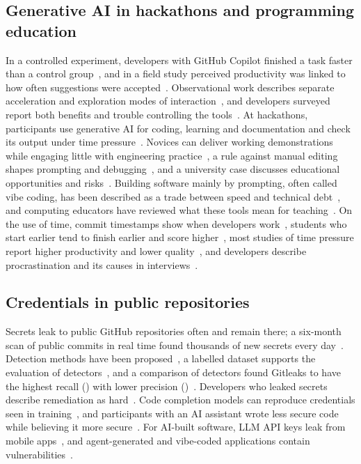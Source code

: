\documentclass{article}
\begin{document}
\subsection{Generative AI in hackathons and programming education}
In a controlled experiment, developers with GitHub Copilot finished a task faster than a control group~\cite{peng2023copilot}, and in a field study perceived productivity was linked to how often suggestions were accepted~\cite{ziegler2024copilot}. Observational work describes separate acceleration and exploration modes of interaction~\cite{barke2023grounded}, and developers surveyed report both benefits and trouble controlling the tools~\cite{liang2024usability}. At hackathons, participants use generative AI for coding, learning and documentation and check its output under time pressure~\cite{zhou2026quickbuild}. Novices can deliver working demonstrations while engaging little with engineering practice~\cite{gama2025vibes}, a rule against manual editing shapes prompting and debugging~\cite{chen2026codeforall}, and a university case discusses educational opportunities and risks~\cite{sajja2024genaihack}. Building software mainly by prompting, often called vibe coding, has been described as a trade between speed and technical debt~\cite{waseem2025vibepractice}, and computing educators have reviewed what these tools mean for teaching~\cite{prather2023robots,denny2024computinged}. On the use of time, commit timestamps show when developers work~\cite{claes2018night}, students who start earlier tend to finish earlier and score higher~\cite{edwards2009behaviors,kazerouni2017procrastination}, most studies of time pressure report higher productivity and lower quality~\cite{kuutila2020timepressure}, and developers describe procrastination and its causes in interviews~\cite{saghi2025procrastination}.

\subsection{Credentials in public repositories}
Secrets leak to public GitHub repositories often and remain there; a six-month scan of public commits in real time found thousands of new secrets every day~\cite{meli2019git}. Detection methods have been proposed~\cite{sinha2015secretkeys}, a labelled dataset supports the evaluation of detectors~\cite{basak2023secretbench}, and a comparison of detectors found Gitleaks to have the highest recall (\gitleaksrecall) with lower precision (\gitleaksprecision)~\cite{basak2023tools}. Developers who leaked secrets describe remediation as hard~\cite{krause2022pushed}. Code completion models can reproduce credentials seen in training~\cite{huang2024codesecret}, and participants with an AI assistant wrote less secure code while believing it more secure~\cite{perry2023insecure}. For AI-built software, LLM API keys leak from mobile apps~\cite{gao2026mindyourkey}, and agent-generated and vibe-coded applications contain vulnerabilities~\cite{zhao2025vibesafe,deng2026vibeinsecurity}.
\end{document}

